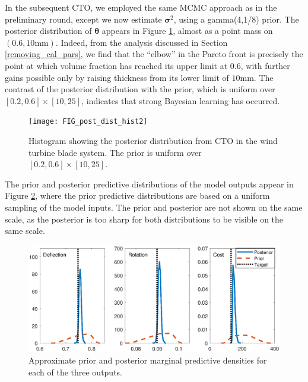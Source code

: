 \documentclass[12pt]{article}
\begin{document}
%
In the subsequent CTO, we employed the same MCMC approach as in the preliminary round, except we now estimate $\boldsymbol\sigma^2$, using a gamma(4,1/8) prior.
%
The posterior distribution of $\boldsymbol\theta$ appears in Figure \ref{fig:wt_marg_post}, almost as a point mass on $(0.6, 10\mathrm{mm})$.
%
Indeed, from the analysis discussed in Section \ref{removing_cal_pars}, we find that the ``elbow'' in the Pareto front is precisely the point at which volume fraction has reached its upper limit at $0.6$, with further gains possible only by raising thickness from its lower limit of $10$mm.
%
The contrast of the posterior distribution with the prior, which is uniform over $[0.2,0.6]\times[10,25]$, indicates that strong Bayesian learning has occurred.
%
\begin{figure}
\centering
\texttt{[image: FIG\_post\_dist\_hist2]}
\caption{Histogram showing the posterior distribution from CTO in the wind turbine blade system. The prior is uniform over $[0.2,0.6]\times[10,25]$.}
\label{fig:wt_marg_post}
\end{figure}
%
The prior and posterior predictive distributions of the model outputs appear in Figure \ref{fig:prior_post_pred_comp}, where the prior predictive distributions are based on a uniform sampling of the model inputs.
%
The prior and posterior are not shown on the same scale, as the posterior is too sharp for both distributions to be visible on the same scale.
%
\begin{figure}[h]
\centering
\includegraphics[scale=0.8]{FIG_prior_vs_posterior_dist}
\caption{Approximate prior and posterior marginal predictive densities for each of the three outputs.}
\label{fig:prior_post_pred_comp}
\end{figure}
\end{document}
